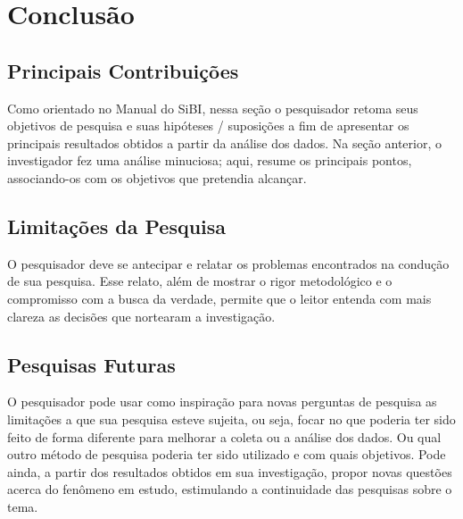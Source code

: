 \chapter{Conclusão}\label{cap:conclusao}

\section{Principais Contribuições}
Como orientado no Manual do SiBI, nessa seção o pesquisador retoma seus objetivos de pesquisa e suas hipóteses / suposições a fim de apresentar os principais resultados obtidos a partir da análise dos dados. Na seção anterior, o investigador fez uma análise minuciosa; aqui, resume os principais pontos, associando-os com os objetivos que pretendia alcançar. 

\section{Limitações da Pesquisa}
O pesquisador deve se antecipar e relatar os problemas encontrados na condução de sua pesquisa. Esse relato, além de mostrar o rigor metodológico e o compromisso com a busca da verdade, permite que o leitor entenda com mais clareza as decisões que nortearam a investigação.

\section{Pesquisas Futuras}
O pesquisador pode usar como inspiração para novas perguntas de pesquisa as limitações a que sua pesquisa esteve sujeita, ou seja, focar no que poderia ter sido feito de forma diferente para melhorar a coleta ou a análise dos dados. Ou qual outro método de pesquisa poderia ter sido utilizado e com quais objetivos.
Pode ainda, a partir dos resultados obtidos em sua investigação, propor novas questões acerca do fenômeno em estudo, estimulando a continuidade das pesquisas sobre o tema.